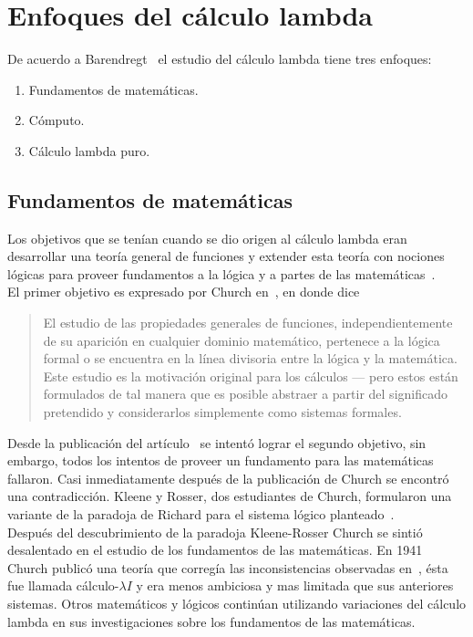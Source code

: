 \section{Enfoques del cálculo lambda}

De acuerdo a Barendregt~\cite{Barendregt:Bible} el estudio del cálculo lambda
tiene tres enfoques:\\

\begin{enumerate}[I]
\item Fundamentos de matemáticas.
\item Cómputo.
\item Cálculo lambda puro.
\end{enumerate}

\subsection{Fundamentos de matemáticas}

Los objetivos que se tenían cuando se dio origen al cálculo lambda eran
desarrollar una teoría general de funciones y extender esta teoría con nociones
lógicas para proveer fundamentos a la lógica y a partes de las
matemáticas~\cite{Barendregt:Bible}.\\

El primer objetivo es expresado por Church en~\cite{Church:LambdaConversion}, en
donde dice

\begin{quote}
El estudio de las propiedades generales de funciones, independientemente de su
aparición en cualquier dominio matemático, pertenece a la lógica formal o se
encuentra en la línea divisoria entre la lógica y la matemática. Este estudio es
la motivación original para los cálculos --- pero estos están formulados de tal
manera que es posible abstraer a partir del significado pretendido y
considerarlos simplemente como sistemas formales.
\end{quote}

Desde la publicación del artículo~\cite{Church:FoundationsLogic} se intentó
lograr el segundo objetivo, sin embargo, todos los intentos de proveer un
fundamento para las matemáticas fallaron. Casi inmediatamente después de la
publicación de Church se encontró una contradicción. Kleene y Rosser, dos
estudiantes de Church, formularon una variante de la paradoja de Richard para el
sistema lógico planteado~\cite{KleeneRosser:paradox}.\\

Después del descubrimiento de la paradoja Kleene-Rosser Church se sintió
desalentado en el estudio de los fundamentos de las matemáticas. En 1941 Church
publicó una teoría que corregía las inconsistencias observadas
en~\cite{KleeneRosser:paradox}, ésta fue llamada cálculo-\(\lambda I\) y era menos
ambiciosa y mas limitada que sus anteriores sistemas. Otros matemáticos y
lógicos continúan utilizando variaciones del cálculo lambda en sus
investigaciones sobre los fundamentos de las matemáticas.\\

